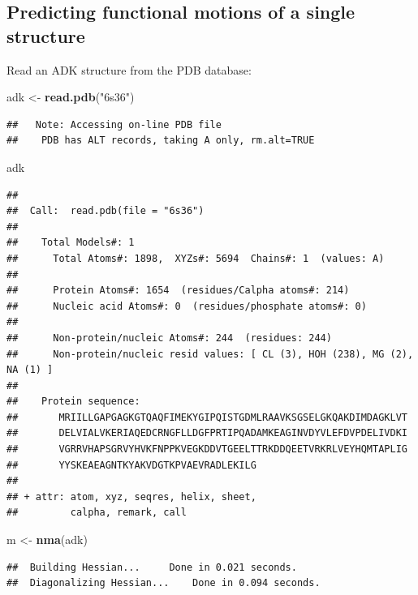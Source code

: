 \documentclass[
]{article}
\newenvironment{Shaded}{\begin{snugshade}}{\end{snugshade}}
\newcommand{\FunctionTok}[1]{\textcolor[rgb]{0.13,0.29,0.53}{\textbf{#1}}}
\newcommand{\NormalTok}[1]{#1}
\newcommand{\OtherTok}[1]{\textcolor[rgb]{0.56,0.35,0.01}{#1}}
\newcommand{\StringTok}[1]{\textcolor[rgb]{0.31,0.60,0.02}{#1}}
\begin{document}
\subsection{Predicting functional motions of a single
structure}\label{predicting-functional-motions-of-a-single-structure}

Read an ADK structure from the PDB database:

\begin{Shaded}
\begin{Highlighting}[]
\NormalTok{adk }\OtherTok{\textless{}{-}} \FunctionTok{read.pdb}\NormalTok{(}\StringTok{"6s36"}\NormalTok{)}
\end{Highlighting}
\end{Shaded}

\begin{verbatim}
##   Note: Accessing on-line PDB file
##    PDB has ALT records, taking A only, rm.alt=TRUE
\end{verbatim}

\begin{Shaded}
\begin{Highlighting}[]
\NormalTok{adk}
\end{Highlighting}
\end{Shaded}

\begin{verbatim}
## 
##  Call:  read.pdb(file = "6s36")
## 
##    Total Models#: 1
##      Total Atoms#: 1898,  XYZs#: 5694  Chains#: 1  (values: A)
## 
##      Protein Atoms#: 1654  (residues/Calpha atoms#: 214)
##      Nucleic acid Atoms#: 0  (residues/phosphate atoms#: 0)
## 
##      Non-protein/nucleic Atoms#: 244  (residues: 244)
##      Non-protein/nucleic resid values: [ CL (3), HOH (238), MG (2), NA (1) ]
## 
##    Protein sequence:
##       MRIILLGAPGAGKGTQAQFIMEKYGIPQISTGDMLRAAVKSGSELGKQAKDIMDAGKLVT
##       DELVIALVKERIAQEDCRNGFLLDGFPRTIPQADAMKEAGINVDYVLEFDVPDELIVDKI
##       VGRRVHAPSGRVYHVKFNPPKVEGKDDVTGEELTTRKDDQEETVRKRLVEYHQMTAPLIG
##       YYSKEAEAGNTKYAKVDGTKPVAEVRADLEKILG
## 
## + attr: atom, xyz, seqres, helix, sheet,
##         calpha, remark, call
\end{verbatim}

\begin{Shaded}
\begin{Highlighting}[]
\NormalTok{m }\OtherTok{\textless{}{-}} \FunctionTok{nma}\NormalTok{(adk)}
\end{Highlighting}
\end{Shaded}

\begin{verbatim}
##  Building Hessian...     Done in 0.021 seconds.
##  Diagonalizing Hessian...    Done in 0.094 seconds.
\end{verbatim}
\end{document}
